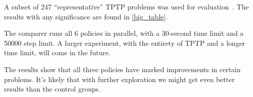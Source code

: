 \documentclass[11pt,twocolumn]{article}
\newcommand{\citen}[1]{~\parencite{#1}}
\begin{document}
A subset of 247 ``representative'' TPTP problems was used for evaluation\citen{chvalovsky2021characteristic}.
The results with any significance are found in \cref{big_table}.

The comparer runs all 6 policies in parallel, with a 30-second time limit and a \num{50000} step limit.
A larger experiment, with the entirety of TPTP and a longer time limit, will come in the future.

The results show that all three policies have marked improvements in certain problems.
It's likely that with further exploration we might get even better results than the control groups.

\renewcommand*{\bibfont}{\small}
\printbibliography{}
\end{document}
